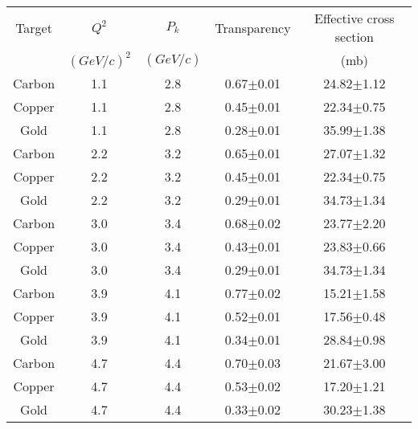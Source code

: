\begin{center}
\begin{tabular}{||c|c|c|c|c||}\hline
 Target & $Q^2$ & $P_k$ & Transparency & Effective cross section \\
 & $(GeV/c)^2$ & $(GeV/c)$ & & (mb)\\\hline
Carbon & 1.1 & 2.8 & 0.67$\pm$0.01 &24.82$\pm$1.12 \\
Copper & 1.1 & 2.8 & 0.45$\pm$0.01 &22.34$\pm$0.75 \\
Gold   & 1.1 & 2.8 & 0.28$\pm$0.01 &35.99$\pm$1.38 \\\hline
Carbon & 2.2 & 3.2 & 0.65$\pm$0.01 &27.07$\pm$1.32 \\
Copper & 2.2 & 3.2 & 0.45$\pm$0.01 &22.34$\pm$0.75 \\
Gold   & 2.2 & 3.2 & 0.29$\pm$0.01 &34.73$\pm$1.34 \\\hline
Carbon & 3.0 & 3.4 & 0.68$\pm$0.02 &23.77$\pm$2.20 \\
Copper & 3.0 & 3.4 & 0.43$\pm$0.01 &23.83$\pm$0.66 \\
Gold   & 3.0 & 3.4 & 0.29$\pm$0.01 &34.73$\pm$1.34 \\\hline
Carbon & 3.9 & 4.1 & 0.77$\pm$0.02 &15.21$\pm$1.58 \\
Copper & 3.9 & 4.1 & 0.52$\pm$0.01 &17.56$\pm$0.48 \\
Gold   & 3.9 & 4.1 & 0.34$\pm$0.01 &28.84$\pm$0.98 \\\hline
Carbon & 4.7 & 4.4 & 0.70$\pm$0.03 &21.67$\pm$3.00 \\
Copper & 4.7 & 4.4 & 0.53$\pm$0.02 &17.20$\pm$1.21 \\
Gold   & 4.7 & 4.4 & 0.33$\pm$0.02 &30.23$\pm$1.38 \\\hline
\end{tabular}
\end{center}